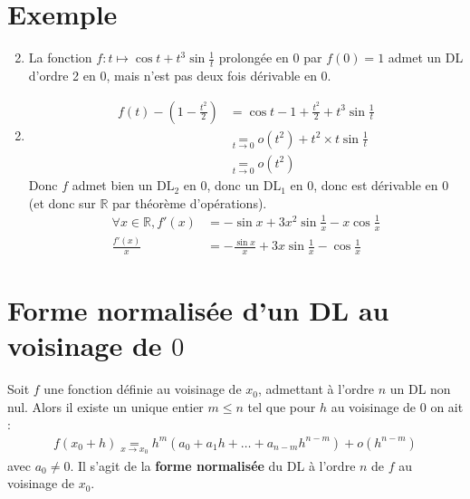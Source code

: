 \documentclass[../main.tex]{subfiles}
\begin{document}
\section{Exemple}
\begin{tcolorbox}[title=Exemple 25.43.2, title filled=false, colframe=darkgreen, colback=darkgreen!10!white]
    \begin{enumerate}
        \setcounter{enumi}{1}
        \item La fonction $f:t\mapsto \cos t + t^3 \sin \frac{1}{t}$ prolongée en $0$ par $f(0) = 1$ admet un DL d'ordre 2 en $0$, mais n'est pas deux fois dérivable en $0$. 
    \end{enumerate}
\end{tcolorbox}

\begin{enumerate}
    \setcounter{enumi}{1}
    \item \begin{align*}
        f(t) - \left( 1 - \frac{t^2}{2} \right) &= \cos t - 1 + \frac{t^2}{2} + t^3 \sin \frac{1}{t} \\
        &\underset{t\to 0}{=} o(t^2) + t^2 \times t \sin \frac{1}{t} \\
        &\underset{t\to 0}{=} o(t^2)
    \end{align*}
    Donc $f$ admet bien un $\text{DL}_2$ en $0$, donc un $\text{DL}_1$ en $0$, donc est dérivable en $0$ (et donc sur $\mathbb{R}$ par théorème d'opérations). 
    \begin{align*}
        \forall x \in \mathbb{R}, f'(x) &= -\sin x + 3x^2 \sin \frac{1}{x} - x\cos \frac{1}{x} \\
        \frac{f'(x)}{x} &= -\frac{\sin x}{x} + 3x \sin \frac{1}{x} - \cos \frac{1}{x}
    \end{align*}
\end{enumerate}

\section{Forme normalisée d'un DL au voisinage de $0$}
\begin{tcolorbox}[title=Propostion 25.50, title filled=false, colframe=lightblue, colback=lightblue!10!white]
    Soit $f$ une fonction définie au voisinage de $x_0$, admettant à l'ordre $n$ un DL non nul. Alors il existe un unique entier $m \leq n$ tel que pour $h$ au voisinage de $0$ on ait : 
    \begin{align*}
        f(x_0 + h) \underset{x\to x_0}{=} h^m(a_0 + a_1 h + \ldots + a_{n-m} h^{n-m}) + o(h^{n-m})
    \end{align*}
    avec $a_0 \neq 0$. Il s'agit de la \textbf{forme normalisée} du DL à l'ordre $n$ de $f$ au voisinage de $x_0$. 
\end{tcolorbox}
\end{document}
